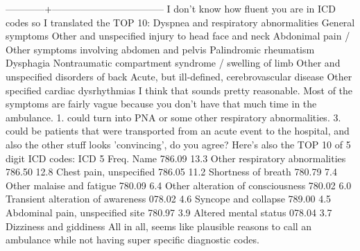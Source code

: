 \markdownRendererInterblockSeparator
{}------------+-----------------------------------\markdownRendererInterblockSeparator
{}\markdownRendererInterblockSeparator
{}I don't know how fluent you are in ICD codes so I translated the TOP 10:\markdownRendererInterblockSeparator
{}\markdownRendererOlBeginTight
{}Dyspnea and respiratory abnormalities\markdownRendererOlItemEnd 
{}General symptoms\markdownRendererOlItemEnd 
{}Other and unspecified injury to head face and neck\markdownRendererOlItemEnd 
{}Abdonimal pain / Other symptoms involving abdomen and pelvis\markdownRendererOlItemEnd 
{}Palindromic rheumatism\markdownRendererOlItemEnd 
{}Dysphagia\markdownRendererOlItemEnd 
{}Nontraumatic compartment syndrome / swelling of limb\markdownRendererOlItemEnd 
{}Other and unspecified disorders of back\markdownRendererOlItemEnd 
{}Acute, but ill-defined, cerebrovascular disease\markdownRendererOlItemEnd 
{}Other specified cardiac dysrhythmias I think that sounds pretty reasonable. Most of the symptoms are fairly vague because you don't have that much time in the ambulance. 1. could turn into PNA or some other respiratory abnormalities. 3. could be patients that were transported from an acute event to the hospital, and also the other stuff looks 'convincing', do you agree?\markdownRendererOlItemEnd 
\markdownRendererOlEndTight \markdownRendererInterblockSeparator
{}Here's also the TOP 10 of 5 digit ICD codes:\markdownRendererInterblockSeparator
{}ICD 5 Freq. Name 786.09 13.3\markdownRendererPercentSign{} Other respiratory abnormalities 786.50 12.8\markdownRendererPercentSign{} Chest pain, unspecified 786.05 11.2\markdownRendererPercentSign{} Shortness of breath 780.79 7.4\markdownRendererPercentSign{} Other malaise and fatigue 780.09 6.4\markdownRendererPercentSign{} Other alteration of consciousness 780.02 6.0\markdownRendererPercentSign{} Transient alteration of awareness 078.02 4.6\markdownRendererPercentSign{} Syncope and collapse 789.00 4.5\markdownRendererPercentSign{} Abdominal pain, unspecified site 780.97 3.9\markdownRendererPercentSign{} Altered mental status 078.04 3.7\markdownRendererPercentSign{} Dizziness and giddiness All in all, seems like plausible reasons to call an ambulance while not having super specific diagnostic codes.\relax